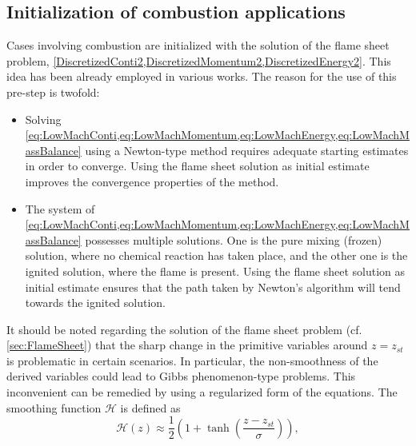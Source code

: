\subsection{Initialization of combustion applications}\label{ssec:MethodCombustion}
Cases involving combustion are initialized with the solution of the flame sheet problem, \cref{DiscretizedConti2,DiscretizedMomentum2,DiscretizedEnergy2}. This idea has been already employed in various works. \cite{smookeNumericalSolutionTwoDimensional1986,smookeNumericalModelingAxisymmetric1992} The reason for the use of this pre-step is twofold:
\begin{itemize}
	\item Solving \cref{eq:LowMachConti,eq:LowMachMomentum,eq:LowMachEnergy,eq:LowMachMassBalance} using a Newton-type method requires adequate starting estimates in order to converge. Using the flame sheet solution as initial estimate improves the convergence properties of the method.
	\item The system of  \cref*{eq:LowMachConti,eq:LowMachMomentum,eq:LowMachEnergy,eq:LowMachMassBalance} possesses multiple solutions. One is the pure mixing (frozen) solution, where no chemical reaction has taken place, and the other one is the ignited solution, where the flame is present. Using the flame sheet solution as initial estimate ensures that the path taken by Newton's algorithm will tend towards the ignited solution.
\end{itemize}

It should be noted regarding the solution of the flame sheet problem (cf. \cref{sec:FlameSheet}) that the sharp change in the primitive variables around $z = z_{st}$  is problematic in certain scenarios. In particular, the non-smoothness of the derived variables could lead to Gibbs phenomenon-type problems. This inconvenient can be remedied by using a regularized form of the equations. The smoothing function $\mathcal{H}$ is defined as
\begin{equation}\label{eq:regularization_MF}
	\mathcal{H}(z) \approx \frac{1}{2}(1+\tanh(\frac{z - z_{st} }{\sigma} )),
\end{equation}


